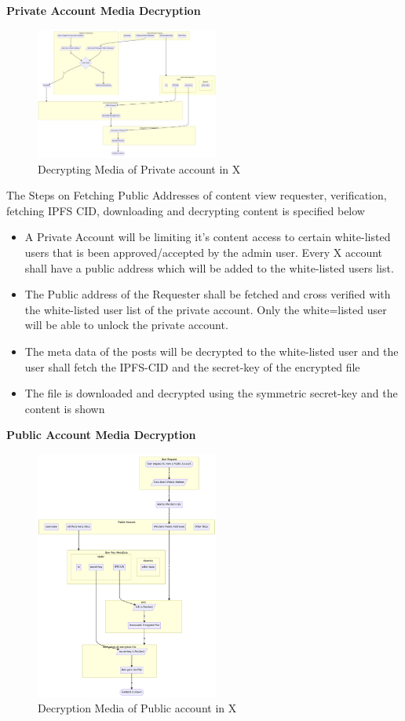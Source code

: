 \documentclass[letterpaper,11pt]{article}
\begin{document}
\textbf{Private Account Media Decryption}\\

\begin{figure}[H]
\begin{center}
\includegraphics[width=6cm]{decryption-private}
\caption{Decrypting Media of Private account in X}
\end{center}
\end{figure}

The Steps on Fetching Public Addresses of content view requester, verification, fetching IPFS CID, downloading and decrypting content is specified below
\begin{itemize}[wide, labelwidth=!, labelindent=0pt]
\item A Private Account will be limiting it's content access to certain white-listed users that is been approved/accepted by the admin user. Every X account shall have a public address which will be added to the white-listed users list.
\item The Public address of the Requester shall be fetched and cross verified with the white-listed user list of the private account. Only the white=listed user will be able to unlock the private account.
\item The meta data of the posts will be decrypted to the white-listed user and the user shall fetch the IPFS-CID and the secret-key of the encrypted file
\item The file is downloaded and decrypted using the symmetric secret-key and the content is shown
\end{itemize}


\textbf{Public Account Media Decryption}\\

\begin{figure}[H]
\begin{center}
\includegraphics[width=6cm]{decryption-public}
\caption{Decryption Media of Public account in X}
\end{center}
\end{figure}
\end{document}
